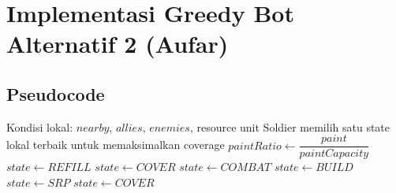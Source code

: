 \section{Implementasi Greedy Bot Alternatif 2 (Aufar)}

\subsection{Pseudocode}

\begin{breakablealgorithm}
	\caption{Greedy State Selection dan Coverage Push pada SoldierBot Alternatif 2}
	\label{alg:alt2-soldier-state}
	\begin{algorithmic}[1]
		\Require Kondisi lokal: $nearby$, $allies$, $enemies$, resource unit
		\Ensure Soldier memilih satu state lokal terbaik untuk memaksimalkan coverage
		\State $paintRatio \gets \dfrac{paint}{paintCapacity}$
		\State $state \gets REFILL$
		\State $state \gets COVER$
		\State $state \gets COMBAT$
		\State $state \gets BUILD$
		\State $state \gets SRP$
		\Else
		\State $state \gets COVER$
		\EndIf

		\State {}
		\State {}
		\State {}
		\State {}
		\EndFunction
	\end{algorithmic}
\end{breakablealgorithm}

